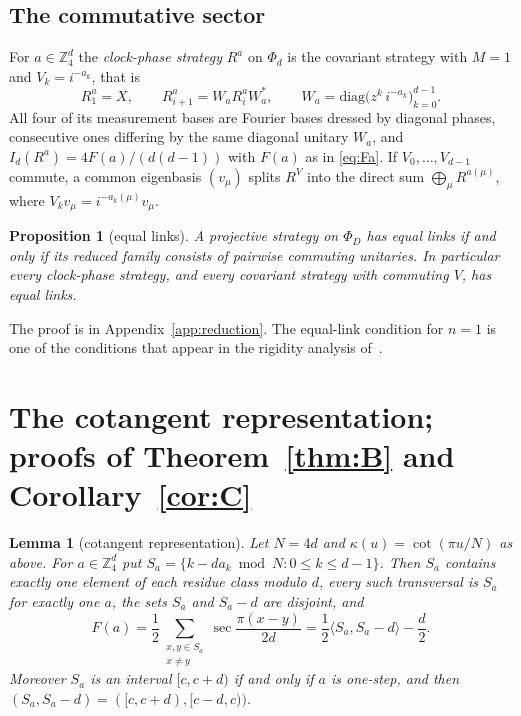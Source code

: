 \documentclass[11pt]{amsart}
\newtheorem{lemma}[theorem]{Lemma}
\newtheorem{proposition}[theorem]{Proposition}
\theoremstyle{definition}
\theoremstyle{remark}
\newcommand{\Z}{\mathbb{Z}}
\newcommand{\ip}[2]{\langle #1,#2\rangle}
\begin{document}
\subsection{The commutative sector}\label{subsec:sector}
For $a\in\Z_4^d$ the \emph{clock-phase strategy} $R^a$ on $\Phi_d$ is the covariant strategy with $M=1$ and
$V_k=i^{-a_k}$, that is
\[
R^a_1=X,\qquad R^a_{i+1}=W_aR^a_iW_a^*,\qquad W_a=\mathrm{diag}\bigl(z^k\,i^{-a_k}\bigr)_{k=0}^{d-1}.
\]
All four of its measurement bases are Fourier bases dressed by diagonal phases, consecutive ones differing by the
same diagonal unitary $W_a$, and $I_d(R^a)=4F(a)/(d(d-1))$ with $F(a)$ as in \eqref{eq:Fa}. If $V_0,\dots,V_{d-1}$
commute, a common eigenbasis $(v_\mu)$ splits $R^V$ into the direct sum $\bigoplus_\mu R^{a(\mu)}$, where
$V_kv_\mu=i^{-a_k(\mu)}v_\mu$.

\begin{proposition}[equal links]\label{prop:links}
A projective strategy on $\Phi_D$ has equal links if and only if its reduced family consists of pairwise
commuting unitaries. In particular every clock-phase strategy, and every covariant strategy with commuting $V$,
has equal links.
\end{proposition}

The proof is in Appendix~\ref{app:reduction}. The equal-link condition for $n=1$ is one of the conditions that
appear in the rigidity analysis of~\cite{repo}.

\section{The cotangent representation; proofs of Theorem~\ref{thm:B} and Corollary~\ref{cor:C}}\label{sec:cot}

\begin{lemma}[cotangent representation]\label{lem:cot}
Let $N=4d$ and $\kappa(u)=\cot(\pi u/N)$ as above. For $a\in\Z_4^d$ put
$S_a=\{k-da_k \bmod N: 0\le k\le d-1\}$. Then $S_a$ contains exactly one element of each residue class modulo
$d$, every such transversal is $S_a$ for exactly one $a$, the sets $S_a$ and $S_a-d$ are disjoint, and
\[
F(a)=\frac12\sum_{\substack{x,y\in S_a\\ x\ne y}}\sec\frac{\pi(x-y)}{2d}=\frac12\ip{S_a}{S_a-d}-\frac d2 .
\]
Moreover $S_a$ is an interval $[c,c+d)$ if and only if $a$ is one-step, and then $(S_a,S_a-d)=([c,c+d),[c-d,c))$.
\end{lemma}
\end{document}
